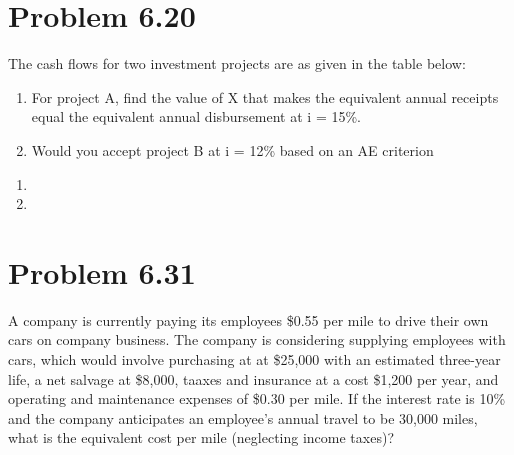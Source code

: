 \documentclass[../INDE250HW.tex]{subfiles}
\begin{document}
\section*{Problem 6.20}
\begin{exmp}
    The cash flows for two investment projects are as given in the table below:
    \begin{enumerate}
        \item For project A, find the value of X that makes the equivalent annual receipts equal the equivalent annual disbursement at i = 15\%.
        \item Would you accept project B at i = 12\% based on an AE criterion
    \end{enumerate}
\end{exmp}
\begin{enumerate}
    \item {}
    \item {}
\end{enumerate}
\section*{Problem 6.31}
\begin{exmp}
    A company is currently paying its employees \$0.55 per mile to drive their own cars on company business. The company is considering supplying employees with cars, which would involve purchasing at at \$25,000 with an estimated three-year life, a net salvage at \$8,000, taaxes and insurance at a cost \$1,200 per year, and operating and maintenance expenses of \$0.30 per mile. If the interest rate is 10\% and the company anticipates an employee's annual travel to be 30,000 miles, what is the equivalent cost per mile (neglecting income taxes)?
\end{exmp}
\begin{center}
\end{center}
\end{document}
